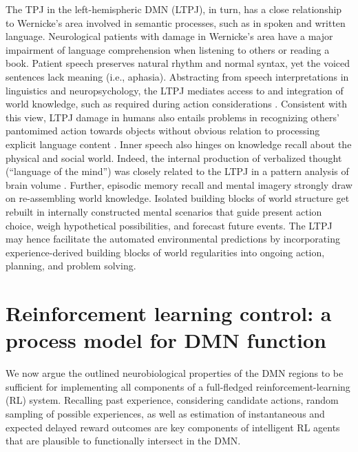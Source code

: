 \documentclass[10pt,letterpaper]{article}
\begin{document}
The TPJ in the left-hemispheric DMN (LTPJ),
in turn, has a close relationship to Wernicke's area
involved in semantic processes, such as in spoken and written language.
Neurological patients with damage in Wernicke's area
have a major impairment of language comprehension
when listening to others or reading a book.
Patient speech
preserves natural rhythm and normal syntax, yet the
voiced sentences lack meaning (i.e., aphasia).
Abstracting from speech interpretations in linguistics
and neuropsychology,
the LTPJ mediates access to and integration of world knowledge,
such as required during action considerations
\citep{binder2011neurobiology, seghier2013angular}.
Consistent with this view,
LTPJ damage in humans also entails problems in recognizing
others' pantomimed action towards objects
without obvious relation to processing explicit language content
\citep{varney1987locus}.
%
Inner speech also hinges on knowledge recall
about the physical and social world.
Indeed,
the internal production of
verbalized thought (``language of the mind'') was closely related to the LTPJ
in a pattern analysis of brain volume
\citep{geva2011neural}.
Further,
episodic memory recall and mental imagery strongly draw on
re-assembling world knowledge.
Isolated building blocks of world structure get rebuilt
in internally constructed mental scenarios that
guide present action choice,
weigh hypothetical possibilities, and forecast future events.
%
The LTPJ may hence facilitate the automated environmental predictions
by incorporating experience-derived building blocks of world regularities
into ongoing action, planning, and problem solving.



\section{Reinforcement learning control: a process model for DMN function}
We now argue the outlined neurobiological properties
of the DMN regions
to be sufficient for implementing all components
of a full-fledged reinforcement-learning (RL) system.
Recalling past experience, considering candidate actions,
random sampling of possible experiences, as well as
estimation of instantaneous and expected delayed reward outcomes
are key components of intelligent RL agents
that are plausible to functionally intersect in the DMN.
\end{document}
